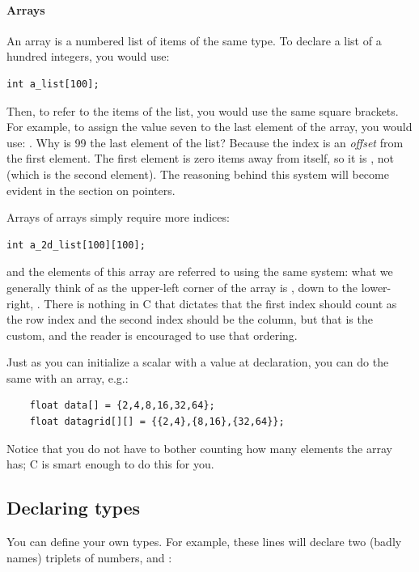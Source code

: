 \documentclass[12pt]{article}
\makeatletter
\def\ind#1{\index{#1}#1}
\def\ttindex#1{\index{#1@\cinline{#1}}}
\makeatother
\begin{document}
\paragraph{Arrays} An \ind{array} is a numbered list of items of the same type. To declare a list of a hundred
integers, you would use:
\begin{lstlisting}
int a_list[100];
\end{lstlisting}
Then, to refer to the items of the list, you would use the same square
brackets. For example, to assign the value seven to the last element
of the array, you would use: . Why is 99 the last
element of the list? Because the index is an {\sl offset} from the first
element. The first element is zero items away from itself, so it is
, not  (which is the second element).
The reasoning behind this system will become evident in the section
on pointers.

Arrays of arrays simply require more indices:\\
\begin{lstlisting}
int a_2d_list[100][100];
\end{lstlisting}
and the elements of this array are referred to using the same system: what we generally think of as the
upper-left corner of the array is , down to the
lower-right, . There is nothing in C that
dictates that the first index should count as the row index and the
second index should be the column, but that is the custom, and the
reader is encouraged to use that ordering.

Just as you can initialize a scalar with a value at declaration, you can
do the same with an array, e.g.:
\begin{lstlisting}
    float data[] = {2,4,8,16,32,64};
    float datagrid[][] = {{2,4},{8,16},{32,64}};
\end{lstlisting}
Notice that you do not have to bother counting how many elements the
array has; C is smart enough to do this for you.

\subsection{Declaring types}\ttindex{typedef}  
You can define your own
types. For example, these lines will declare two (badly names) triplets
of numbers,  and :
\end{document}
